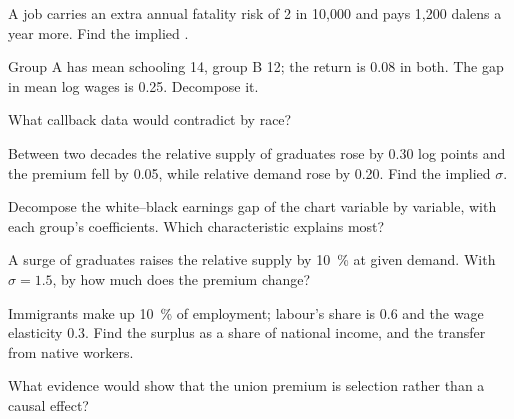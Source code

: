 \begin{exercise}[$\star$]\label{exo:b3:wage-structure:2}
A job carries an extra annual fatality risk of 2 in 10{,}000 and pays 1{,}200 dalens a year more.
Find the implied .
\end{exercise}

\begin{exercise}[$\star$]\label{exo:b3:wage-structure:3}
Group A has mean schooling 14, group B 12; the return is 0.08 in both. The gap in mean log
wages is 0.25. Decompose it.
\end{exercise}

\begin{exercise}[$\star$]\label{exo:b3:wage-structure:4}
What callback data would contradict  by race?
\end{exercise}

\begin{exercise}[$\star\star$]\label{exo:b3:wage-structure:5}
Between two decades the relative supply of graduates rose by 0.30 log points and the
premium fell by 0.05, while relative demand rose by 0.20. Find the implied $\sigma$.
\end{exercise}

\begin{exercise}[$\star\star$]\label{exo:b3:wage-structure:6}
Decompose the white--black earnings gap of the chart variable by variable, with each
group's coefficients. Which characteristic explains most?
\end{exercise}

\begin{exercise}[$\star\star$]\label{exo:b3:wage-structure:7}
A surge of graduates raises the relative supply by 10~\% at given demand. With $\sigma = 1.5$, by how
much does the premium change?
\end{exercise}

\begin{exercise}[$\star\star$]\label{exo:b3:wage-structure:8}
Immigrants make up 10~\% of employment; labour's share is 0.6 and the wage elasticity 0.3. Find the
surplus as a share of national income, and the transfer from native workers.
\end{exercise}

\begin{exercise}[$\star\star$]\label{exo:b3:wage-structure:9}
What evidence would show that the union premium is selection rather than a causal
effect?
\end{exercise}

